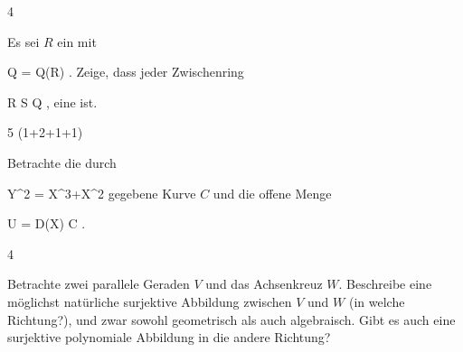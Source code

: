 
{4}
{





Es sei $R$ ein
mit

\mavergleichskette
{\vergleichskette
{Q
}
{ = }{ Q(R)
}
{  }{
}
{    }{
}
{   }{
}
}
{}{}{.}
Zeige, dass jeder Zwischenring

 {}
 {R \subseteq S \subseteq Q} {}
 {} {} {} {,}
eine
ist.





}
{} {}

{5 (1+2+1+1)}
{





Betrachte die durch

\mavergleichskette
{\vergleichskette
{ Y^2
}
{ = }{ X^3+X^2
}
{  }{
}
{    }{
}
{   }{
}
}
{}{}{}
gegebene Kurve $C$  {} {} und die offene Menge

\mavergleichskette
{\vergleichskette
{ U
}
{ = }{ D(X)
}
{ \subseteq }{ C
}
{    }{
}
{   }{
}
}
{}{}{.}





}
{} {}

{4}
{





Betrachte zwei parallele Geraden $V$ und das Achsenkreuz $W$. Beschreibe eine möglichst natürliche surjektive Abbildung zwischen $V$ und $W$ (in welche Richtung?), und zwar sowohl geometrisch als auch algebraisch. Gibt es auch eine surjektive polynomiale Abbildung in die andere Richtung?





}
{} {}

